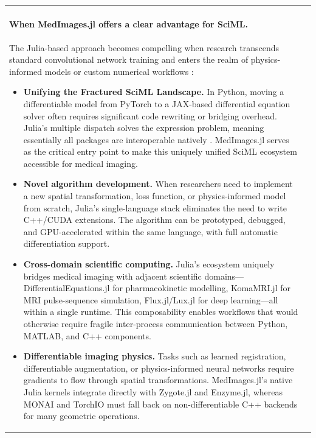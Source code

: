 \documentclass[10pt,letterpaper]{article}
\begin{document}
\begin{table}[H]
\begin{tabular}{|p{}|p{}|}
\paragraph{When MedImages.jl offers a clear advantage for SciML.}
The Julia-based approach becomes compelling when research transcends standard convolutional network training and enters the realm of physics-informed models or custom numerical workflows \cite{RoeschGreener2023}:
\begin{itemize}
    \item \textbf{Unifying the Fractured SciML Landscape.} In Python, moving a differentiable model from PyTorch to a JAX-based differential equation solver often requires significant code rewriting or bridging overhead. Julia's multiple dispatch solves the expression problem, meaning essentially all packages are interoperable natively \cite{PalBhattacharya2024, EschleGl2023}. MedImages.jl serves as the critical entry point to make this uniquely unified SciML ecosystem accessible for medical imaging.
    \item \textbf{Novel algorithm development.} When researchers need to implement a new spatial transformation, loss function, or physics-informed model from scratch, Julia's single-language stack eliminates the need to write C++/CUDA extensions. The algorithm can be prototyped, debugged, and GPU-accelerated within the same language, with full automatic differentiation support.
    \item \textbf{Cross-domain scientific computing.} Julia's ecosystem uniquely bridges medical imaging with adjacent scientific domains---DifferentialEquations.jl for pharmacokinetic modelling, KomaMRI.jl \cite{CastilloPassiCoronado2023} for MRI pulse-sequence simulation, Flux.jl/Lux.jl \cite{pal2023lux} for deep learning---all within a single runtime. This composability enables workflows that would otherwise require fragile inter-process communication between Python, MATLAB, and C++ components.
    \item \textbf{Differentiable imaging physics.} Tasks such as learned registration, differentiable augmentation, or physics-informed neural networks require gradients to flow through spatial transformations. MedImages.jl's native Julia kernels integrate directly with Zygote.jl and Enzyme.jl, whereas MONAI and TorchIO must fall back on non-differentiable C++ backends for many geometric operations.
\end{itemize}



\end{tabular}
\end{table}
\end{document}
